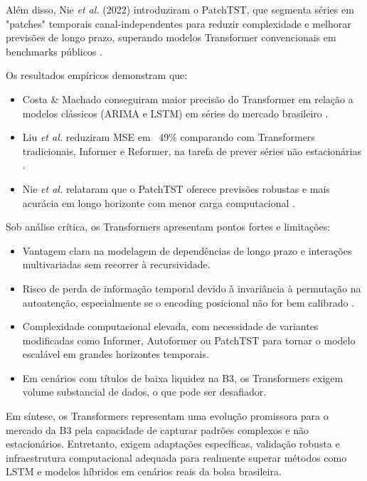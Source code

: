 Além disso, Nie \textit{et al.} (2022) introduziram o PatchTST, que segmenta séries em "patches" temporais canal-independentes para reduzir complexidade e melhorar previsões de longo prazo, superando modelos Transformer convencionais em benchmarks públicos \cite{nie2023patchtst}.

Os resultados empíricos demonstram que:
\begin{itemize}
  \item Costa \& Machado conseguiram maior precisão do Transformer em relação a modelos clássicos (ARIMA e LSTM) em séries do mercado brasileiro \cite{costa2023ibovespa}.
  \item Liu \textit{et al.} reduziram MSE em ~49\% comparando com Transformers tradicionais, Informer e Reformer, na tarefa de prever séries não estacionárias \cite{liu2022nonstationary}.
  \item Nie \textit{et al.} relataram que o PatchTST oferece previsões robustas e mais acurácia em longo horizonte com menor carga computacional \cite{nie2023patchtst}.
\end{itemize}


Sob análise crítica, os Transformers apresentam pontos fortes e limitações:

\begin{itemize}
  \item Vantagem clara na modelagem de dependências de longo prazo e interações multivariadas sem recorrer à recursividade.
  \item Risco de perda de informação temporal devido à invariância à permutação na autoatenção, especialmente se o encoding posicional não for bem calibrado \cite{zeng2022effectiveness}.
  \item Complexidade computacional elevada, com necessidade de variantes modificadas como Informer, Autoformer ou PatchTST para tornar o modelo escalável em grandes horizontes temporais.
  \item Em cenários com títulos de baixa liquidez na B3, os Transformers exigem volume substancial de dados, o que pode ser desafiador.
\end{itemize}

Em síntese, os Transformers representam uma evolução promissora para o mercado da B3 pela capacidade de capturar padrões complexos e não estacionários. Entretanto, exigem adaptações específicas, validação robusta e infraestrutura computacional adequada para realmente superar métodos como LSTM e modelos híbridos em cenários reais da bolsa brasileira.




